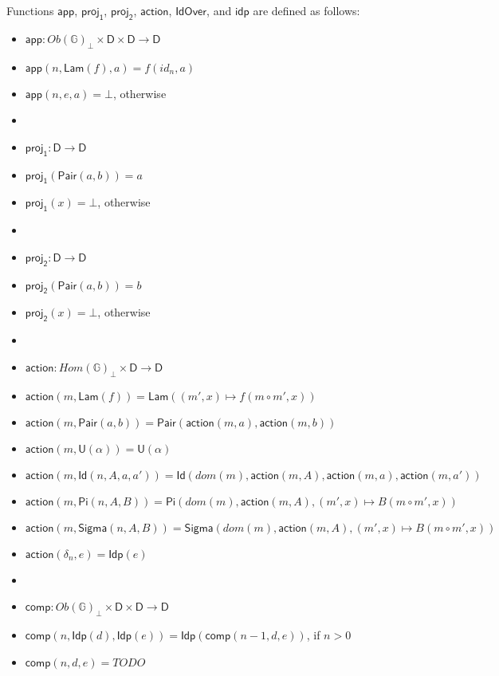 \documentclass{amsart}
\theoremstyle{definition}
\theoremstyle{remark}
\newcommand{\D}{\mathsf{D}}
\newcommand{\bbG}{\mathbb{G}}
\numberwithin{table}{section}
\begin{document}
Functions $\mathsf{app}$, $\mathsf{proj_1}$, $\mathsf{proj_2}$, $\mathsf{action}$, $\mathsf{IdOver}$, and $\mathsf{idp}$ are defined as follows:
\begin{itemize}
\item[] $\mathsf{app} : Ob(\bbG)_\bot \times \D \times \D \to \D$
\item[] $\mathsf{app}(n,\mathsf{Lam}(f),a) = f(id_n,a)$
\item[] $\mathsf{app}(n,e,a) = \bot$, otherwise
\item[]
\item[] $\mathsf{proj_1} : \D \to \D$
\item[] $\mathsf{proj_1}(\mathsf{Pair}(a,b)) = a$
\item[] $\mathsf{proj_1}(x) = \bot$, otherwise
\item[]
\item[] $\mathsf{proj_2} : \D \to \D$
\item[] $\mathsf{proj_2}(\mathsf{Pair}(a,b)) = b$
\item[] $\mathsf{proj_2}(x) = \bot$, otherwise
\item[]
\item[] $\mathsf{action} : Hom(\bbG)_\bot \times \D \to \D$
\item[] $\mathsf{action}(m, \mathsf{Lam}(f)) = \mathsf{Lam}((m',x) \mapsto f(m \circ m', x))$
\item[] $\mathsf{action}(m, \mathsf{Pair}(a, b)) = \mathsf{Pair}(\mathsf{action}(m, a), \mathsf{action}(m, b))$
\item[] $\mathsf{action}(m, \mathsf{U}(\alpha)) = \mathsf{U}(\alpha)$
\item[] $\mathsf{action}(m, \mathsf{Id}(n, A, a, a')) = \mathsf{Id}(dom(m), \mathsf{action}(m, A), \mathsf{action}(m, a), \mathsf{action}(m, a'))$
\item[] $\mathsf{action}(m, \mathsf{Pi}(n, A, B)) = \mathsf{Pi}(dom(m), \mathsf{action}(m, A), (m', x) \mapsto B(m \circ m', x))$
\item[] $\mathsf{action}(m, \mathsf{Sigma}(n, A, B)) = \mathsf{Sigma}(dom(m), \mathsf{action}(m, A), (m', x) \mapsto B(m \circ m', x))$
\item[] $\mathsf{action}(\delta_n, e) = \mathsf{Idp}(e)$
\item[]
\item[] $\mathsf{comp} : Ob(\bbG)_\bot \times \D \times \D \to \D$
\item[] $\mathsf{comp}(n, \mathsf{Idp}(d), \mathsf{Idp}(e)) = \mathsf{Idp}(\mathsf{comp}(n - 1, d, e))$, if $n > 0$
\item[] $\mathsf{comp}(n, d, e) = TODO$
\end{itemize}
\end{document}
